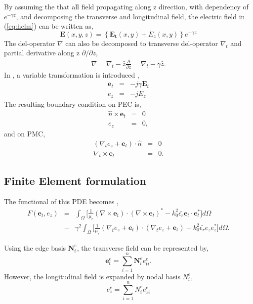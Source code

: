 \documentclass{pj}
\begin{document}
By assuming the that all field propagating along z direction, with dependency of $e^{-\gamma z}$, and decomposing the transverse and longitudinal field, the electric field in (\ref{eq:helm}) can be written as,
%
\begin{equation}
\mathbf{E}(x, y, z) = \left \{ \mathbf{E_t}(x,y) + E_z(x,y) \right \} e^{-\gamma z} \nonumber
\end{equation}
%
The del-operator $\nabla$ can also be decomposed to transverse del-operator $\nabla_t$ and partial derivative along z $\partial / \partial z$,
\begin{eqnarray}
\nabla = \nabla_t - \hat{z} \frac{\partial}{\partial z}  = \nabla_t -\gamma \hat{z}.
\nonumber
\end{eqnarray}
%
In \cite{na_JinJM_JinJM_2014_finite_element}, a variable transformation is introduced , 
\begin{eqnarray}
\mathbf{e}_t &=& -j\gamma \mathbf{E}_t \nonumber \\
e_z &=& -jE_z
\label{tranf2}
\end{eqnarray}
%
The resulting boundary condition on PEC is, 
\begin{eqnarray}
\hat{n} \times \mathbf{e}_t &=& 0 \nonumber \\
e_z &=& 0,
\end{eqnarray}
and on PMC,
\begin{eqnarray}
(\nabla_t e_z + \mathbf{e}_t) \cdot \hat{n} &=& 0 \nonumber \\
\nabla_t \times \mathbf{e}_t  &=& 0.
\end{eqnarray}

\subsection{Finite Element formulation}
The functional of this PDE becomes \cite{na_JinJM_JinJM_2014_finite_element},
\begin{eqnarray}
F\left(\mathbf{e}_t,e_z\right) &=& \int_\Omega \bigg[ \frac{1}{\mu_r} (\nabla \times \mathbf{e}_t)
\cdot ( \nabla \times \mathbf{e}_t )^* - k_0^2 \bar{\epsilon_r} \mathbf{e}_t \cdot \mathbf{e}_t^* \bigg]d\Omega \nonumber \\
&-& \gamma^2 \int_\Omega \bigg[ \frac{1}{\mu_r}(\nabla_t e_z + \mathbf{e}_t)\cdot(\nabla_t e_z + \mathbf{e}_t) - k_0^2 \bar{\epsilon_r} e_z e_z^* \bigg] d\Omega.
\label{eq:variation}
\end{eqnarray}

Using the edge basis $\mathbf{N}_i^e$, the transverse field can be represented by,
\begin{equation}
\mathbf{e}_t^e = \sum_{i=1}^{n} \mathbf{N}_i^e e_{ti}^e
\label{et}.
\end{equation}
However, the longitudinal field is expanded by nodal basis $N_i^e$,
\begin{equation}
e_z^e = \sum_{i=1}^n N_i^e e_{zi}^e
\label{ez}
\end{equation}
\end{document}
